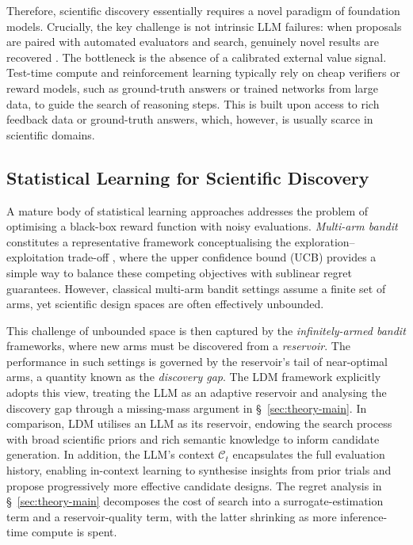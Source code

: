 Therefore, scientific discovery essentially requires a novel paradigm of foundation models.  Crucially, the key challenge is not intrinsic LLM failures: when proposals are paired with automated evaluators and search, genuinely novel results are recovered \citep{novikov2025alphaevolve}. The bottleneck is the absence of a calibrated external value signal.  Test-time compute and reinforcement learning typically rely on cheap verifiers or reward models, such as ground-truth answers or trained networks from large data, to guide the search of reasoning steps. This is built upon access to rich feedback data or ground-truth answers, which, however, is usually scarce in scientific domains.

\subsection{Statistical Learning for Scientific Discovery}

A mature body of statistical learning approaches addresses the problem of optimising a black-box reward function with noisy evaluations. \emph{Multi-arm bandit} constitutes a representative framework conceptualising the exploration--exploitation trade-off \citep{lattimoreBanditAlgorithms2020}, where the upper confidence bound (UCB) \citep{auerUsingConfidenceBounds2002} provides a simple way to balance these competing objectives with sublinear regret guarantees. However, classical multi-arm bandit settings assume a finite set of arms, yet scientific design spaces are often effectively unbounded.

This challenge of unbounded space is then captured by the \emph{infinitely-armed bandit} \citep{berry1997bandit, wang2008infinitely} frameworks, where new arms must be discovered from a \emph{reservoir}. The performance in such settings is governed by the reservoir's tail of near-optimal arms, a quantity known as the \emph{discovery gap}. The LDM framework explicitly adopts this view, treating the LLM as an adaptive reservoir and analysing the discovery gap through a missing-mass argument \citep{mcallester2000convergence, berend2013concentration} in \S~\ref{sec:theory-main}. In comparison, LDM utilises an LLM as its reservoir, endowing the search process with broad scientific priors and rich semantic knowledge to inform candidate generation. In addition, the LLM’s context $\mathcal{C}_t$ encapsulates the full evaluation history, enabling in-context learning to synthesise insights from prior trials and propose progressively more effective candidate designs. The regret analysis in \S~\ref{sec:theory-main} decomposes the cost of search into a surrogate-estimation term and a reservoir-quality term, with the latter shrinking as more inference-time compute is spent.

